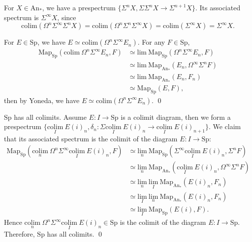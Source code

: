 \documentclass[UTF8,12,a4paper]{ctexart}
\theoremstyle{definition}
\newcommand{\An}{\text{An}}
\newcommand{\Sp}{\text{Sp}}
\begin{document}
\exm 
For $X\in\An_*$, we have a prespectrum
$\{\Sigma^n X, \Sigma \Sigma^n X\rightarrow \Sigma^{n+1}X\}.$ Its associated spectrum is $\Sigma^\infty X$, since
$$
\text{colim}(\Omega^n \Sigma^\infty \Sigma^n X)
=\text{colim}(\Omega^n \Sigma^n\Sigma^\infty  X)
=\text{colim}(\Sigma^\infty  X)
=\Sigma^\infty  X.
$$

\lem 
For $E\in \Sp$, we have $E\simeq \text{colim}(\Omega^n \Sigma^\infty  E_n)$.
\pf 
For any $F\in \Sp$, 
\begin{align*}
\text{Map}_\Sp(\text{colim}\ \Omega^n \Sigma^\infty  E_n, F)
&\simeq \text{lim}\ \text{Map}_\Sp(\Omega^n \Sigma^\infty  E_n, F)\\
&\simeq \text{lim}\ \text{Map}_{\An_*}(  E_n,\Omega^\infty \Sigma^n F)\\
&\simeq \text{lim}\ \text{Map}_{\An_*}(  E_n,F_n)\\
&\simeq \text{Map}_\Sp(E, F),
\end{align*}
then by Yoneda, we have $E\simeq \text{colim}(\Omega^n \Sigma^\infty  E_n)$.
\qed

\prop 
$\Sp$ has all colimits.
\pf Assume $E:I\rightarrow \Sp$ is a colimit diagram, then we form a prespectrum
$\{\underset{I}{\text{colim}}\  E(i)_n, 
\delta_n: \Sigma \underset{I}{\text{colim}}\  E(i)_n\rightarrow 
\underset{I}{\text{colim}}\  E(i)_{n+1}\}.$ We claim that its associated spectrum is the colimit of the diagram $E:I\rightarrow \Sp:$
\begin{align*}
\text{Map}_\Sp(\underset{n}{\text{colim}}\ \Omega^n\Sigma^\infty \underset{I}{\text{colim}}\  E(i)_n, F )
&\simeq 
\underset{n}{\text{lim}}\ \text{Map}_\Sp(\Sigma^\infty \underset{I}{\text{colim}}\  E(i)_n,\Sigma^n F )\\
&\simeq 
\underset{n}{\text{lim}}\ \text{Map}_{\An_*}( \underset{I}{\text{colim}}\  E(i)_n,\Omega^\infty \Sigma^n F )\\
&\simeq 
\underset{n}{\text{lim}}\ \underset{I}{\text{lim}}\ \text{Map}_{\An_*}(  E(i)_n,F_n )\\
&\simeq 
\underset{I}{\text{lim}}\ \underset{n}{\text{lim}}\ \text{Map}_{\An_*}(  E(i)_n,F_n )\\
&\simeq 
\underset{I}{\text{lim}}\ \text{Map}_{\Sp}(  E(i),F).
\end{align*}
Hence $\underset{n}{\text{colim}}\ \Omega^n\Sigma^\infty \underset{I}{\text{colim}}\  E(i)_n\in \Sp $ is the colimit of the diagram $E:I\rightarrow \Sp$.
Therefore, $\Sp$ has all colimits.
\qed
\end{document}
